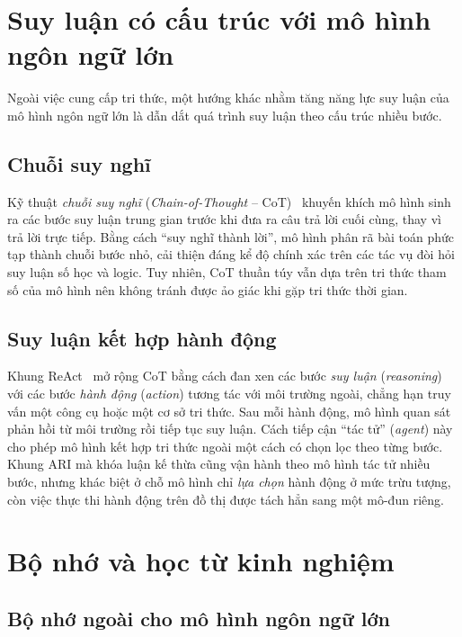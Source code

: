\section{Suy luận có cấu trúc với mô hình ngôn ngữ lớn}
\label{sec:reasoning}

Ngoài việc cung cấp tri thức, một hướng khác nhằm tăng năng lực suy luận của mô hình ngôn ngữ lớn
là dẫn dắt quá trình suy luận theo cấu trúc nhiều bước.

\subsection{Chuỗi suy nghĩ}

Kỹ thuật \textit{chuỗi suy nghĩ} (\textit{Chain-of-Thought} -- CoT)~\cite{wei2022cot} khuyến khích
mô hình sinh ra các bước suy luận trung gian trước khi đưa ra câu trả lời cuối cùng, thay vì trả
lời trực tiếp. Bằng cách ``suy nghĩ thành lời'', mô hình phân rã bài toán phức tạp thành chuỗi
bước nhỏ, cải thiện đáng kể độ chính xác trên các tác vụ đòi hỏi suy luận số học và logic. Tuy
nhiên, CoT thuần túy vẫn dựa trên tri thức tham số của mô hình nên không tránh được ảo giác khi
gặp tri thức thời gian.

\subsection{Suy luận kết hợp hành động}

Khung ReAct~\cite{yao2023react} mở rộng CoT bằng cách đan xen các bước \textit{suy luận}
(\textit{reasoning}) với các bước \textit{hành động} (\textit{action}) tương tác với môi trường
ngoài, chẳng hạn truy vấn một công cụ hoặc một cơ sở tri thức. Sau mỗi hành động, mô hình quan sát
phản hồi từ môi trường rồi tiếp tục suy luận. Cách tiếp cận ``tác tử'' (\textit{agent}) này cho
phép mô hình kết hợp tri thức ngoài một cách có chọn lọc theo từng bước. Khung ARI mà khóa luận kế
thừa cũng vận hành theo mô hình tác tử nhiều bước, nhưng khác biệt ở chỗ mô hình chỉ \emph{lựa
chọn} hành động ở mức trừu tượng, còn việc thực thi hành động trên đồ thị được tách hẳn sang một
mô-đun riêng.

\section{Bộ nhớ và học từ kinh nghiệm}
\label{sec:memory-bg}

\subsection{Bộ nhớ ngoài cho mô hình ngôn ngữ lớn}


